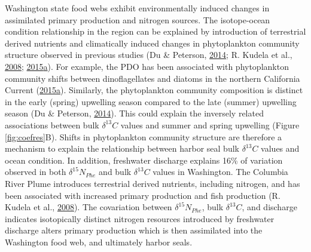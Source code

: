 \documentclass [11pt, proquest] {uwthesis}[2015/03/03]
\begin{document}
Washington state food webs exhibit environmentally induced changes in
assimilated primary production and nitrogen sources. The isotope-ocean
condition relationship in the region can be explained by introduction of
terrestrial derived nutrients and climatically induced changes in
phytoplankton community structure observed in previous studies (Du \&
Peterson, \protect\hyperlink{ref-Du2014}{2014}; R. Kudela et al.,
\protect\hyperlink{ref-Kudela2008}{2008};
\protect\hyperlink{ref-Du2015}{2015}\protect\hyperlink{ref-Du2015}{a}).
For example, the PDO has been associated with phytoplankton community
shifts between dinoflagellates and diatoms in the northern California
Current
(\protect\hyperlink{ref-Du2015}{2015}\protect\hyperlink{ref-Du2015}{a}).
Similarly, the phytoplankton community composition is distinct in the
early (spring) upwelling season compared to the late (summer) upwelling
season (Du \& Peterson, \protect\hyperlink{ref-Du2014}{2014}). This
could explain the inversely related associations between bulk
\(\delta^{13}C\) values and summer and spring upwelling (Figure
\ref{fig:coefres}B). Shifts in phytoplankton community structure are
therefore a mechanism to explain the relationship between harbor seal
bulk \(\delta^{13}C\) values and ocean condition. In addition,
freshwater discharge explains 16\% of variation observed in both
\(\delta^{15}N_{Phe}\) and bulk \(\delta^{13}C\) values in Washington.
The Columbia River Plume introduces terrestrial derived nutrients,
including nitrogen, and has been associated with increased primary
production and fish production (R. Kudela et al.,
\protect\hyperlink{ref-Kudela2008}{2008}). The covariation between
\(\delta^{15}N_{Phe}\), bulk \(\delta^{13}C\), and discharge indicates
isotopically distinct nitrogen resources introduced by freshwater
discharge alters primary production which is then assimilated into the
Washington food web, and ultimately harbor seals.
\end{document}
